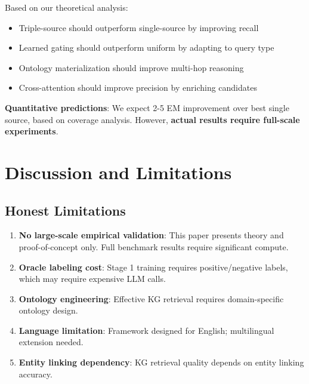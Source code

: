 \documentclass[10pt,twocolumn]{article}
\begin{document}
Based on our theoretical analysis:

\begin{itemize}
    \item Triple-source should outperform single-source by improving recall
    \item Learned gating should outperform uniform by adapting to query type
    \item Ontology materialization should improve multi-hop reasoning
    \item Cross-attention should improve precision by enriching candidates
\end{itemize}

\textbf{Quantitative predictions}: We expect 2-5 EM improvement over best single source, based on coverage analysis. However, \textbf{actual results require full-scale experiments}.

\section{Discussion and Limitations}

\subsection{Honest Limitations}

\begin{enumerate}
    \item \textbf{No large-scale empirical validation}: This paper presents theory and proof-of-concept only. Full benchmark results require significant compute.
    
    \item \textbf{Oracle labeling cost}: Stage 1 training requires positive/negative labels, which may require expensive LLM calls.
    
    \item \textbf{Ontology engineering}: Effective KG retrieval requires domain-specific ontology design.
    
    \item \textbf{Language limitation}: Framework designed for English; multilingual extension needed.
    
    \item \textbf{Entity linking dependency}: KG retrieval quality depends on entity linking accuracy.
\end{enumerate}
\end{document}
